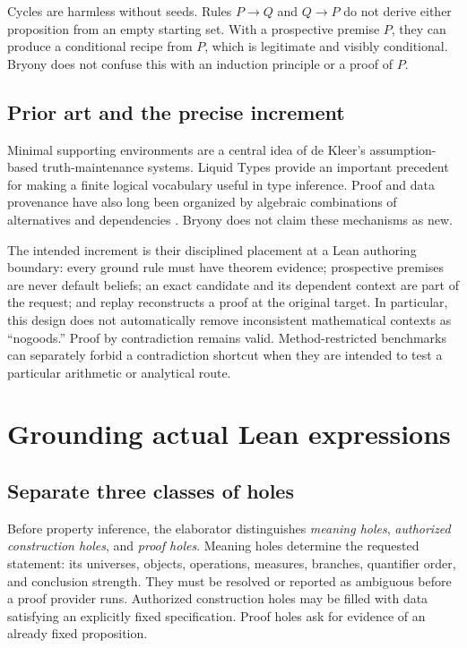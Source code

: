 \documentclass[11pt,a4paper]{article}
\theoremstyle{definition}\newtheorem{definition}[theorem]{Definition}
\theoremstyle{remark}\newtheorem{remark}[theorem]{Remark}
\begin{document}
Cycles are harmless without seeds. Rules $P\to Q$ and $Q\to P$ do not derive either proposition from an empty starting set. With a prospective premise $P$, they can produce a conditional recipe from $P$, which is legitimate and visibly conditional. Bryony does not confuse this with an induction principle or a proof of $P$.

\subsection{Prior art and the precise increment}
Minimal supporting environments are a central idea of de Kleer's assumption-based truth-maintenance systems. Liquid Types provide an important precedent for making a finite logical vocabulary useful in type inference. Proof and data provenance have also long been organized by algebraic combinations of alternatives and dependencies \cite{atms,liquid,provenance}. Bryony does not claim these mechanisms as new.

The intended increment is their disciplined placement at a Lean authoring boundary: every ground rule must have theorem evidence; prospective premises are never default beliefs; an exact candidate and its dependent context are part of the request; and replay reconstructs a proof at the original target. In particular, this design does not automatically remove inconsistent mathematical contexts as ``nogoods.'' Proof by contradiction remains valid. Method-restricted benchmarks can separately forbid a contradiction shortcut when they are intended to test a particular arithmetic or analytical route.

\section{Grounding actual Lean expressions}\label{sec:grounding}

\subsection{Separate three classes of holes}
Before property inference, the elaborator distinguishes \emph{meaning holes}, \emph{authorized construction holes}, and \emph{proof holes}. Meaning holes determine the requested statement: its universes, objects, operations, measures, branches, quantifier order, and conclusion strength. They must be resolved or reported as ambiguous before a proof provider runs. Authorized construction holes may be filled with data satisfying an explicitly fixed specification. Proof holes ask for evidence of an already fixed proposition.
\end{document}
